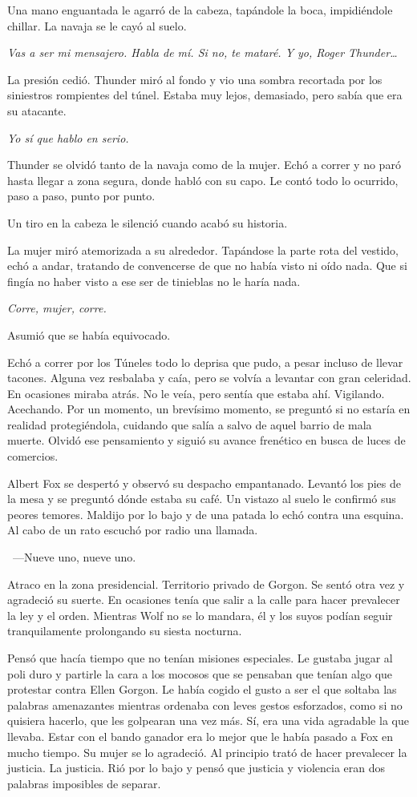 Una mano enguantada le agarró de la cabeza, tapándole la boca, impidiéndole chillar. La navaja se le cayó al suelo.

\emph{Vas a ser mi mensajero. Habla de mí. Si no, te mataré. Y yo, Roger Thunder\dots}

La presión cedió. Thunder miró al fondo y vio una sombra recortada por los siniestros rompientes del túnel. Estaba muy lejos, demasiado, pero sabía que era su atacante.

\emph{Yo sí que hablo en serio.}

Thunder se olvidó tanto de la navaja como de la mujer. Echó a correr y no paró hasta llegar a zona segura, donde habló con su capo. Le contó todo lo ocurrido, paso a paso, punto por punto.

Un tiro en la cabeza le silenció cuando acabó su historia.

La mujer miró atemorizada a su alrededor. Tapándose la parte rota del vestido, echó a andar, tratando de convencerse de que no había visto ni oído nada. Que si fingía no haber visto a ese ser de tinieblas no le haría nada.

\emph{Corre, mujer, corre.}

Asumió que se había equivocado.

Echó a correr por los Túneles todo lo deprisa que pudo, a pesar incluso de llevar tacones. Alguna vez resbalaba y caía, pero se volvía a levantar con gran celeridad. En ocasiones miraba atrás. No le veía, pero sentía que estaba ahí. Vigilando. Acechando. Por un momento, un brevísimo momento, se preguntó si no estaría en realidad protegiéndola, cuidando que salía a salvo de aquel barrio de mala muerte. Olvidó ese pensamiento y siguió su avance frenético en busca de luces de comercios.

\parbreak
Albert Fox se despertó y observó su despacho empantanado. Levantó los pies de la mesa y se preguntó dónde estaba su café. Un vistazo al suelo le confirmó sus peores temores. Maldijo por lo bajo y de una patada lo echó contra una esquina. Al cabo de un rato escuchó por radio una llamada.

~---Nueve uno, nueve uno.

Atraco en la zona presidencial. Territorio privado de Gorgon. Se sentó otra vez y agradeció su suerte. En ocasiones tenía que salir a la calle para hacer prevalecer la ley y el orden. Mientras Wolf no se lo mandara, él y los suyos podían seguir tranquilamente prolongando su siesta nocturna.

Pensó que hacía tiempo que no tenían misiones especiales. Le gustaba jugar al poli duro y partirle la cara a los mocosos que se pensaban que tenían algo que protestar contra Ellen Gorgon. Le había cogido el gusto a ser el que soltaba las palabras amenazantes mientras ordenaba con leves gestos esforzados, como si no quisiera hacerlo, que les golpearan una vez más. Sí, era una vida agradable la que llevaba. Estar con el bando ganador era lo mejor que le había pasado a Fox en mucho tiempo. Su mujer se lo agradeció. Al principio trató de hacer prevalecer la justicia. La justicia. Rió por lo bajo y pensó que justicia y violencia eran dos palabras imposibles de separar.

